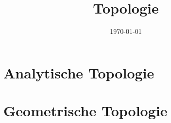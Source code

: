 \documentclass{mycourse}
\title{Topologie}
\date{\today}
\begin{document}
\maketitle

\tableofcontents


\part{Analytische Topologie}





\part{Geometrische Topologie}

\end{document}
